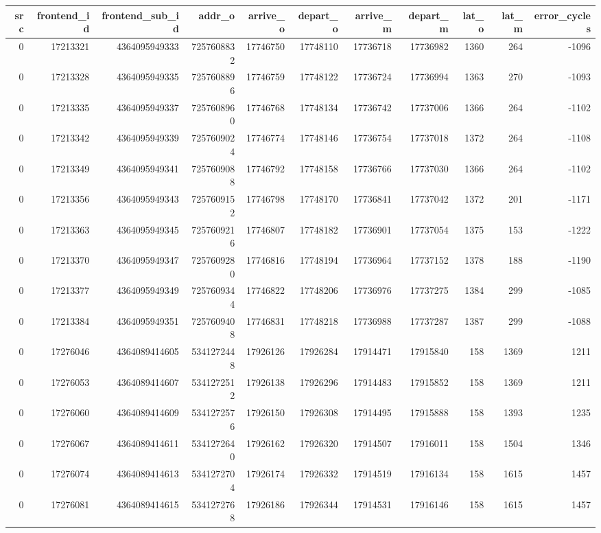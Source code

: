\begin{tabular}{rrrrrrrrrrr}
\toprule
src & frontend\_id & frontend\_sub\_id & addr\_o & arrive\_o & depart\_o & arrive\_m & depart\_m & lat\_o & lat\_m & error\_cycles \\
\midrule
0 & 17213321 & 4364095949333 & 7257608832 & 17746750 & 17748110 & 17736718 & 17736982 & 1360 & 264 & -1096 \\
0 & 17213328 & 4364095949335 & 7257608896 & 17746759 & 17748122 & 17736724 & 17736994 & 1363 & 270 & -1093 \\
0 & 17213335 & 4364095949337 & 7257608960 & 17746768 & 17748134 & 17736742 & 17737006 & 1366 & 264 & -1102 \\
0 & 17213342 & 4364095949339 & 7257609024 & 17746774 & 17748146 & 17736754 & 17737018 & 1372 & 264 & -1108 \\
0 & 17213349 & 4364095949341 & 7257609088 & 17746792 & 17748158 & 17736766 & 17737030 & 1366 & 264 & -1102 \\
0 & 17213356 & 4364095949343 & 7257609152 & 17746798 & 17748170 & 17736841 & 17737042 & 1372 & 201 & -1171 \\
0 & 17213363 & 4364095949345 & 7257609216 & 17746807 & 17748182 & 17736901 & 17737054 & 1375 & 153 & -1222 \\
0 & 17213370 & 4364095949347 & 7257609280 & 17746816 & 17748194 & 17736964 & 17737152 & 1378 & 188 & -1190 \\
0 & 17213377 & 4364095949349 & 7257609344 & 17746822 & 17748206 & 17736976 & 17737275 & 1384 & 299 & -1085 \\
0 & 17213384 & 4364095949351 & 7257609408 & 17746831 & 17748218 & 17736988 & 17737287 & 1387 & 299 & -1088 \\
0 & 17276046 & 4364089414605 & 5341272448 & 17926126 & 17926284 & 17914471 & 17915840 & 158 & 1369 & 1211 \\
0 & 17276053 & 4364089414607 & 5341272512 & 17926138 & 17926296 & 17914483 & 17915852 & 158 & 1369 & 1211 \\
0 & 17276060 & 4364089414609 & 5341272576 & 17926150 & 17926308 & 17914495 & 17915888 & 158 & 1393 & 1235 \\
0 & 17276067 & 4364089414611 & 5341272640 & 17926162 & 17926320 & 17914507 & 17916011 & 158 & 1504 & 1346 \\
0 & 17276074 & 4364089414613 & 5341272704 & 17926174 & 17926332 & 17914519 & 17916134 & 158 & 1615 & 1457 \\
0 & 17276081 & 4364089414615 & 5341272768 & 17926186 & 17926344 & 17914531 & 17916146 & 158 & 1615 & 1457 \\

\end{tabular}
